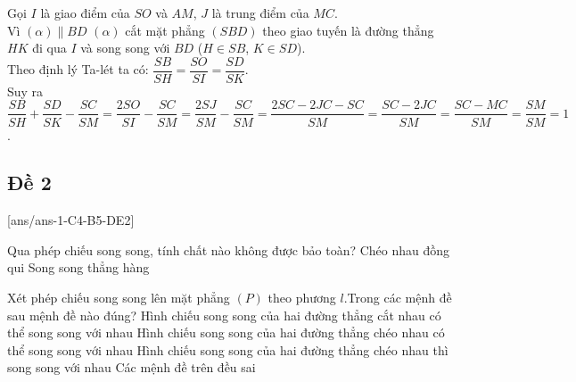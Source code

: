 \begin{ex}
{\begin{center}
	\end{center}
		Gọi $I$ là giao điểm của $SO$ và $AM$, $J$ là trung điểm của $MC$.\\
		Vì $(\alpha) \parallel BD$ $(\alpha)$ cắt mặt phẳng $(SBD)$ theo giao tuyến là đường thẳng $HK$ đi qua $I$ và song song với $BD$ ($H \in SB$, $K \in SD$).\\
		Theo định lý Ta-lét ta có: $\dfrac{SB}{SH}=\dfrac{SO}{SI}=\dfrac{SD}{SK}$.\\
		Suy ra $\dfrac{SB}{SH}+\dfrac{SD}{SK}-\dfrac{SC}{SM}=\dfrac{2SO}{SI}-\dfrac{SC}{SM}=\dfrac{2SJ}{SM}-\dfrac{SC}{SM}=\dfrac{2SC-2JC-SC}{SM}=\dfrac{SC-2JC}{SM}=\dfrac{SC-MC}{SM}=\dfrac{SM}{SM}=1$.
}
\end{ex}

\subsection{Đề 2}
[ans/ans-1-C4-B5-DE2]
\caulc
\begin{ex}%
Qua phép chiếu song song, tính chất nào không được bảo toàn?
\choice
{\True Chéo nhau}
{đồng qui}
{Song song}
{thẳng hàng}
\end{ex}

\begin{ex}%
Xét phép chiếu song song lên mặt phẳng $(P)$ theo phương $l$.Trong các mệnh đề  sau mệnh đề nào đúng?
\choice
{Hình chiếu song song của hai đường thẳng cắt nhau có thể song song với nhau}
{\True Hình chiếu song song của hai đường thẳng chéo nhau có thể song song với nhau}
{Hình chiếu song song của hai đường thẳng chéo nhau thì song song với nhau}
{Các mệnh đề trên đều sai}
\end{ex}

